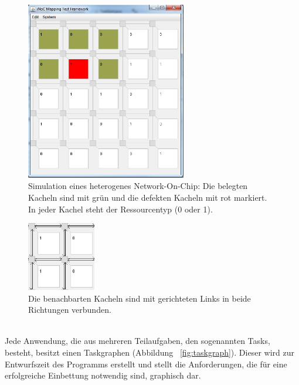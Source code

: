 \begin{figure}[H]\centering
\includegraphics[width = 70mm]{bilder/NoC.jpg}
\caption{Simulation eines heterogenes Network-On-Chip: Die belegten Kacheln sind mit grün und die defekten Kacheln mit rot markiert. In jeder Kachel steht der Ressourcentyp (0 oder 1).}\label{fig:nocbild}
\end{figure}

\begin{figure}[H]\centering
  \includegraphics[width = 30mm]{bilder/Links.jpg}
  \caption{Die benachbarten Kacheln sind mit gerichteten Links in beide Richtungen verbunden.}\label{fig:links}
\end{figure}
\ \\
Jede Anwendung, die aus mehreren Teilaufgaben, den sogenannten Tasks, besteht, besitzt einen Taskgraphen (Abbildung ~\ref{fig:taskgraph}). Dieser wird zur Entwurfszeit des Programms erstellt und stellt die Anforderungen, die für eine erfolgreiche Einbettung notwendig sind, graphisch dar.

